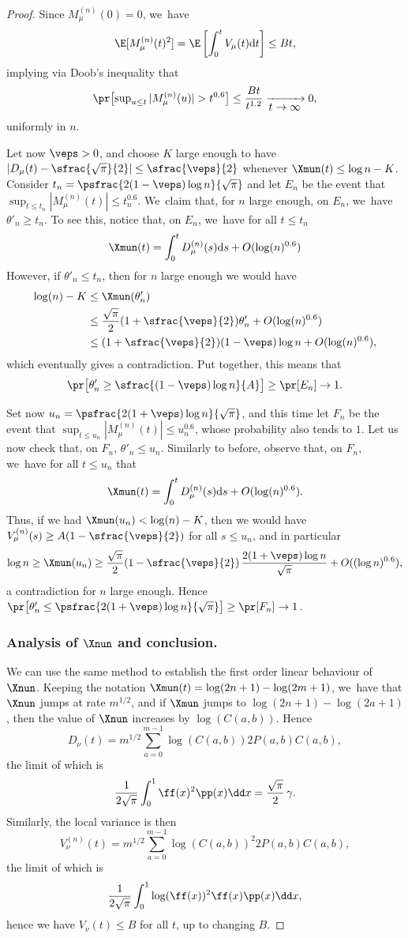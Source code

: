 \begin{proof}
Since $M^{(n)}_{\mu}(0)=0$, we~have
\[
\E[M^{(n)}_{\mu}(t)^2]=\E\left[\int_{0}^t V_{\mu}(t)\mathrm d t\right]\leq Bt,
\]
implying via Doob's inequality that
\[
\pr\bigl[\sup \nolimits_{u\leq t} |M^{(n)}_{\mu}(u)|>t^{0.6}\bigr]\leq \frac{Bt}{t^{1.2}} \xrightarrow[\textstyle t\to\infty]{} 0,
\]
uniformly in $n$.

Let now $\veps>0$, and choose $K$ large enough to have $|D_{\mu}(t)-\sfrac{\sqrt{\pi}}{2}|\leq \sfrac{\veps}{2}$ whenever $\Xmun(t)\leq \log n - K$. Consider $t_n=\psfrac{2(1-\veps)\log n}{\sqrt{\pi}}$ and let $E_n$ be the event that $\sup_{t\leq t_n}|M^{(n)}_{\mu}(t) |\leq t_n^{0.6}$. We~claim that, for $n$ large enough, on $E_n$, we~have $\theta'_n\geq t_n$. To see this, notice that, on $E_n$, we~have for all $t\leq t_n$
\[
\Xmun(t)=\int_0^t D^{(n)}_{\mu}(s)\mathrm ds + O(\log(n)^{0.6})
\]
However, if $\theta'_n\leq t_n$, then for $n$ large enough we would have
\begin{align*}
\log(n)-K &\leq \Xmun(\theta'_n)\\
&\leq \frac{\sqrt{\pi}}{2}(1+\sfrac{\veps}{2})\theta'_n +O(\log(n)^{0.6}) \\
&\leq (1+\sfrac{\veps}{2})(1-\veps)\log n +O(\log(n)^{0.6}),
\end{align*}
which eventually gives a contradiction. Put together, this means that
\[
\pr\bigl[\theta'_n\geq \sfrac{(1-\veps)\log n}{A}\bigr]\geq \pr[E_n] \to 1.
\]

Set now $u_n=\psfrac{2(1+\veps)\log n}{\sqrt{\pi}}$, and this time let $F_n$ be the event that $\sup_{t\leq u_n}| M^{(n)}_{\mu}(t)| \leq u_n^{0.6}$, whose probability also tends to $1$. Let us now check that, on $F_n$, $\theta'_n\leq u_n$. Similarly to before, observe that, on $F_n$, we~have for all $t\leq u_n$ that
\[
\Xmun(t)=\int_0^t D^{(n)}_{\mu}(s)\mathrm ds + O(\log(n)^{0.6}).
\]
Thus, if we had $\Xmun(u_n)< \log(n)-K$,
then we would have $V^{(n)}_{\mu}(s)\geq A(1-\sfrac{\veps}{2})$ for all $s\leq u_n$, and in particular
\[
\log n \geq \Xmun(u_n)\geq \frac{\sqrt{\pi}}{2}(1-\sfrac{\veps}{2})\,\frac{2(1+\veps)\log n}{\sqrt{\pi}}+ O((\log n)^{0.6}),
\]
a contradiction for $n$ large enough. Hence $\pr\bigl[\theta'_n\leq \psfrac{2(1+\veps)\log n}{\sqrt{\pi}}\bigr]\geq \pr[F_n]\to 1$.

\subsubsection*{Analysis of $\Xnun$ and conclusion.}
We can use the same method to establish the first order linear behaviour of $\Xnun$. Keeping the notation $\Xmun(t)=\log (2n+1) - \log (2m+1)$, we~have that $\Xnun$ jumps at rate $m^{1/2}$, and if $\Xmun$ jumps to $\log (2n+1) - \log (2a+1)$, then the value of $\Xnun$ increases by $\log(C(a,b))$. Hence
\[
D_{\nu}(t)=m^{1/2}\sum_{a=0}^{m-1} \log (C(a,b)) 2P(a,b)C(a,b),
\]
the limit of which is
\[
\frac1{2\sqrt{\pi}}\int_{0}^1 \ff(x)^2\pp(x)\dd x=\frac{\sqrt{\pi}}{2}\,\gamma.
\]
Similarly, the local variance is then
\[
V_{\nu}^{(n)}(t)=m^{1/2}\sum_{a=0}^{m-1} \log(C(a,b))^2 2P(a,b)C(a,b),
\]
the limit of which is
\[
\frac1{2\sqrt{\pi}}\int_{0}^1 \log(\ff(x))^2\ff(x)\pp(x)\dd x,
\]
hence we have $V_{\nu}(t)\leq B$ for all $t$, up to changing $B$.


\end{proof}
